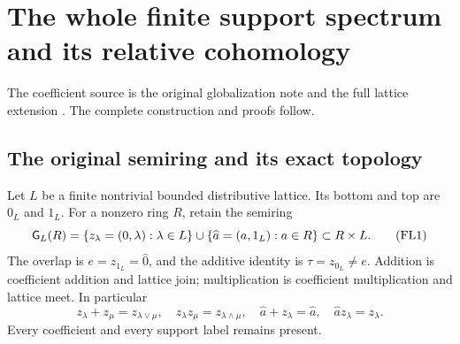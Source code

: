 

\section{The whole finite support spectrum and its relative cohomology}
\label{sec:full-finite-support}
The coefficient source is the original globalization note and the full lattice extension \cite{globalization,support}. The complete construction and proofs follow.
\subsection{The original semiring and its exact topology}

Let $L$ be a finite nontrivial bounded distributive lattice. Its bottom
and top are $0_L$ and $1_L$. For a nonzero ring $R$, retain the semiring
\[
 \mathsf G_L(R)=\{z_\lambda=(0,\lambda):\lambda\in L\}
     \cup\{\widehat a=(a,1_L):a\in R\}\subset R\times L.
 \tag{FL1}\label{FL:eq:semiring}
\]
The overlap is $e=z_{1_L}=\widehat0$, and the additive identity is
$\tau=z_{0_L}\ne e$. Addition is coefficient addition and lattice
join; multiplication is coefficient multiplication and lattice meet.
In particular
\[
 z_\lambda+z_\mu=z_{\lambda\vee\mu},\quad
 z_\lambda z_\mu=z_{\lambda\wedge\mu},\quad
 \widehat a+z_\lambda=\widehat a,\quad
 \widehat a z_\lambda=z_\lambda.
 \tag{FL2}\label{FL:eq:operations}
\]
Every coefficient and every support label remains present.

